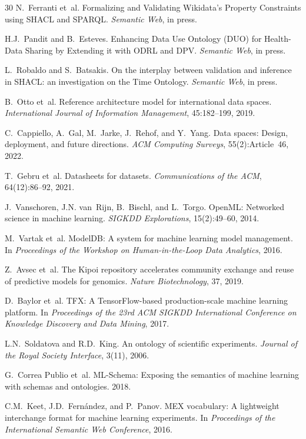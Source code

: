 \documentclass[11pt,a4paper]{article}
\begin{document}
\begin{thebibliography}{30}
 N.~Ferranti et~al. Formalizing and Validating Wikidata's Property Constraints using SHACL and SPARQL. \emph{Semantic Web}, in press.

 H.J.~Pandit and B.~Esteves. Enhancing Data Use Ontology (DUO) for Health-Data Sharing by Extending it with ODRL and DPV. \emph{Semantic Web}, in press.

 L.~Robaldo and S.~Batsakis. On the interplay between validation and inference in SHACL: an investigation on the Time Ontology. \emph{Semantic Web}, in press.

 B.~Otto et~al. Reference architecture model for international data spaces. \emph{International Journal of Information Management}, 45:182--199, 2019.

 C.~Cappiello, A.~Gal, M.~Jarke, J.~Rehof, and Y.~Yang. Data spaces: Design, deployment, and future directions. \emph{ACM Computing Surveys}, 55(2):Article~46, 2022.

 T.~Gebru et~al. Datasheets for datasets. \emph{Communications of the ACM}, 64(12):86--92, 2021.

 J.~Vanschoren, J.N. van~Rijn, B.~Bischl, and L.~Torgo. OpenML: Networked science in machine learning. \emph{SIGKDD Explorations}, 15(2):49--60, 2014.

 M.~Vartak et~al. ModelDB: A system for machine learning model management. In \emph{Proceedings of the Workshop on Human-in-the-Loop Data Analytics}, 2016.

 Z.~Avsec et~al. The Kipoi repository accelerates community exchange and reuse of predictive models for genomics. \emph{Nature Biotechnology}, 37, 2019.

 D.~Baylor et~al. TFX: A TensorFlow-based production-scale machine learning platform. In \emph{Proceedings of the 23rd ACM SIGKDD International Conference on Knowledge Discovery and Data Mining}, 2017.

 L.N.~Soldatova and R.D.~King. An ontology of scientific experiments. \emph{Journal of the Royal Society Interface}, 3(11), 2006.

 G.~Correa Publio et~al. ML-Schema: Exposing the semantics of machine learning with schemas and ontologies. 2018.

 C.M.~Keet, J.D.~Fernández, and P.~Panov. MEX vocabulary: A lightweight interchange format for machine learning experiments. In \emph{Proceedings of the International Semantic Web Conference}, 2016.


\end{thebibliography}
\end{document}
